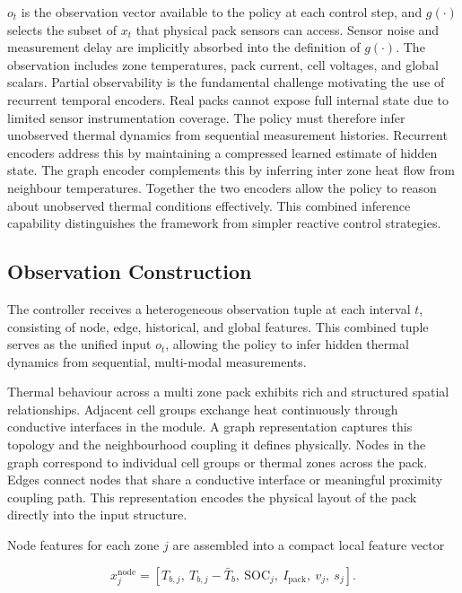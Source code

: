 \documentclass[twocolumn]{article}
\begin{document}
$o_t$ is the observation vector available to the policy at each control step, and $g(\cdot)$ selects the subset of $x_t$ that physical pack sensors can access. Sensor noise and measurement delay are implicitly absorbed into the definition of $g(\cdot)$. The observation includes zone temperatures, pack current, cell voltages, and global scalars. Partial observability is the fundamental challenge motivating the use of recurrent temporal encoders. Real packs cannot expose full internal state due to limited sensor instrumentation coverage. The policy must therefore infer unobserved thermal dynamics from sequential measurement histories. Recurrent encoders address this by maintaining a compressed learned estimate of hidden state. The graph encoder complements this by inferring inter zone heat flow from neighbour temperatures. Together the two encoders allow the policy to reason about unobserved thermal conditions effectively. This combined inference capability distinguishes the framework from simpler reactive control strategies.

\subsection*{Observation Construction}

The controller receives a heterogeneous observation tuple at each interval $t$, consisting of node, edge, historical, and global features. This combined tuple serves as the unified input $o_t$, allowing the policy to infer hidden thermal dynamics from sequential, multi-modal measurements.

Thermal behaviour across a multi zone pack exhibits rich and structured spatial relationships. Adjacent cell groups exchange heat continuously through conductive interfaces in the module. A graph representation captures this topology and the neighbourhood coupling it defines physically. Nodes in the graph correspond to individual cell groups or thermal zones across the pack. Edges connect nodes that share a conductive interface or meaningful proximity coupling path. This representation encodes the physical layout of the pack directly into the input structure.

Node features for each zone $j$ are assembled into a compact local feature vector

\begin{equation}
x^{\mathrm{node}}_j = [T_{b,j},\ T_{b,j}-\bar T_b,\ \mathrm{SOC}_j,\ I_{\mathrm{pack}},\ v_j,\ s_j].
\end{equation}
\end{document}
